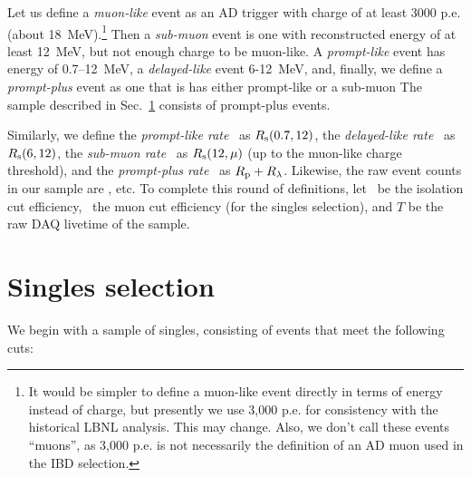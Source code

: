 \documentclass[../thesis.tex]{subfiles}
\begin{document}
Let us define a \emph{muon-like} event as an AD trigger with charge of at least
3000 p.e. (about 18~MeV).\footnote{It would be simpler to define a muon-like
  event directly in terms of energy instead of charge, but presently we use
  3,000 p.e. for consistency with the historical LBNL analysis. This may change.
  Also, we don't call these events ``muons'', as 3,000 p.e. is not necessarily
  the definition of an AD muon used in the IBD selection.} Then a
\emph{sub-muon} event is one with reconstructed energy of at least 12~MeV, but
not enough charge to be muon-like. A \emph{prompt-like} event has energy of
0.7--12~MeV, a \emph{delayed-like} event 6-12~MeV, and, finally, we define a
\emph{prompt-plus} event as one that is has either prompt-like or a sub-muon The
sample described in Sec.~\ref{sec:singsel} consists of prompt-plus events.

Similarly, we define the \emph{prompt-like rate} \Rpro\ as $R_\mathrm{s}(0.7, 12)$, the \emph{delayed-like rate} \Rdel\ as $R_\mathrm{s}(6, 12)$, the \emph{sub-muon rate} \Rsub\ as $R_\mathrm{s}(12, \mu)$ (up to the muon-like charge threshold), and the \emph{prompt-plus rate} \Rplu\ as $R_\mathrm{p} + R_\mathrm{\lambda}$. Likewise, the raw event counts in our sample are \Npro, etc. To complete this round of definitions, let \eisol\ be the isolation cut efficiency, \emu\ the muon cut efficiency (for the singles selection), and $T$ be the raw DAQ livetime of the sample.

\section{Singles selection}
\label{sec:singsel}

We begin with a sample of singles, consisting of events that meet the following cuts:

\end{document}
